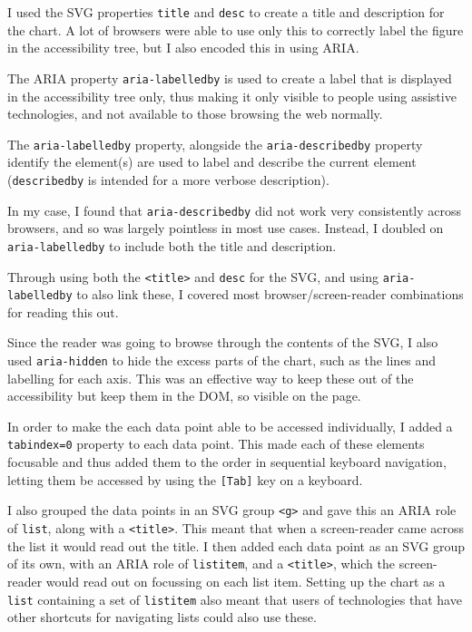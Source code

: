 \documentclass[ %
                    author={Aleena Baig},
                supervisor={Dr Simon Lock},
                    degree={BSc},
                     title={On Making Web Accessible Graphs},
                  subtitle={},
                      year={2019} ]{dissertation}
\begin{document}
I used the SVG properties \texttt{title} and \texttt{desc} to create a title and description for the chart. A lot of browsers were able to use only this to correctly label the figure in the accessibility tree, but I also encoded this in using ARIA.

The ARIA property \texttt{aria-labelledby} is used to create a label that is displayed in the accessibility tree only, thus making it only visible to people using assistive technologies, and not available to those browsing the web normally.

The \texttt{aria-labelledby} property, alongside the \texttt{aria-describedby} property identify the element(s) are used to label and describe the current element (\texttt{describedby} is intended for a more verbose description).

In my case, I found that \texttt{aria-describedby} did not work very consistently across browsers, and so was largely pointless in most use cases. Instead, I doubled on \texttt{aria-labelledby} to include both the title and description.

Through using both the \texttt{<title>} and \texttt{desc} for the SVG, and using \texttt{aria-labelledby} to also link these, I covered most browser/screen-reader combinations for reading this out.

Since the reader was going to browse through the contents of the SVG, I also used \texttt{aria-hidden} to hide the excess parts of the chart, such as the lines and labelling for each axis. This was an effective way to keep these out of the accessibility but keep them in the DOM, so visible on the page.


In order to make the each data point able to be accessed individually, I added a \texttt{tabindex=0} property to each data point. This made each of these elements focusable and thus added them to the order in sequential keyboard navigation, letting them be accessed by using the \texttt{[Tab]} key on a keyboard.

I also grouped the data points in an SVG group \texttt{<g>} and gave this an ARIA role of \texttt{list}, along with a \texttt{<title>}. This meant that when a screen-reader came across the list it would read out the title. I then added each data point as an SVG group of its own, with an ARIA role of \texttt{listitem}, and a \texttt{<title>}, which the screen-reader would read out on focussing on each list item. Setting up the chart as a \texttt{list} containing a set of \texttt{listitem} also meant that users of technologies that have other shortcuts for navigating lists could also use these.
\end{document}
